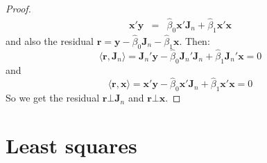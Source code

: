\documentclass[12pt]{article}
\begin{document}
\begin{enumerate}
\begin{proof}
\begin{eqnarray}
            \textbf{x}'\textbf{y} &=& \hat{\beta}_0 \textbf{x}'\textbf{J}_n + \hat{\beta}_1 \textbf{x}'\textbf{x}
        \end{eqnarray} 
    and also the residual $\textbf{r} = \textbf{y} - \hat{\beta}_0 \textbf{J}_n - \hat{\beta}_1 \textbf{x}$.
    Then: 
    $$\langle \textbf{r}, \textbf{J}_n \rangle = \textbf{J}_n'\textbf{y} - \hat{\beta}_0 \textbf{J}_n'\textbf{J}_n + \hat{\beta}_1 \textbf{J}_n'\textbf{x} = 0$$
    and
    $$\langle \textbf{r}, \textbf{x} \rangle = \textbf{x}'\textbf{y} - \hat{\beta}_0 \textbf{x}'\textbf{J}_n + \hat{\beta}_1 \textbf{x}'\textbf{x} = 0$$
    So we get the residual $\textbf{r} \bot \textbf{J}_n$ and $\textbf{r} \bot \textbf{x}$.
    \end{proof}
\end{enumerate}

\section{Least squares}
\end{document}
